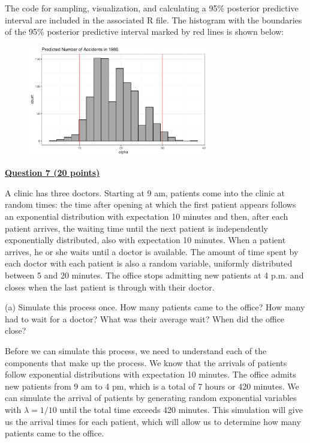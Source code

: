 \documentclass[12pt]{article}
\begin{document}
The code for sampling, visualization, and calculating a 95\% posterior predictive interval are included in
the associated R file. The histogram with the boundaries of the 95\% posterior predictive interval marked
by red lines is shown below:

\begin{figure}[h]
    \centering
    \includegraphics[width=0.7\textwidth]{q6b_plot.pdf} \\
\end{figure}


\pagebreak

{\underline{\bf Question 7 (20 points)}}  

A clinic has three doctors. Starting at 9 am, patients come into the clinic at random times: the time after opening at which the first patient appears follows an exponential distribution with expectation 10 minutes and then, after each patient arrives, the waiting time until the next patient is independently exponentially distributed, also with expectation 10 minutes.   When a patient arrives, he or she waits until a doctor is available. The amount of time spent by each doctor with each patient is also a random variable, uniformly distributed between 5 and 20 minutes. The office stops admitting new patients at 4 p.m. and closes when the last patient is through with their doctor.

(a) Simulate this process once. How many patients came to the office? How many had to wait for a doctor? What was their average wait? When did the office close?

Before we can simulate this process, we need to understand each of the components that make up the process. We know that the
arrivals of patients follow exponential distributions with expectation 10 minutes. The office admits new patients from 9 am
to 4 pm, which is a total of 7 hours or 420 minutes. We can simulate the arrival of patients by generating random exponential
variables with $\lambda = 1/10$ until the total time exceeds 420 minutes. This simulation will give us the arrival times
for each patient, which will allow us to determine how many patients came to the office.
\end{document}
